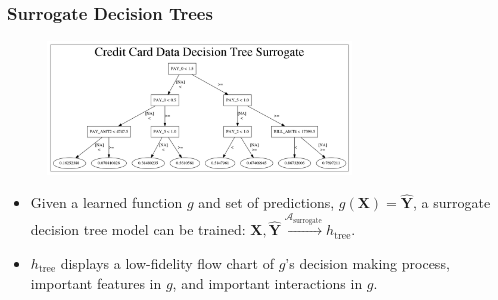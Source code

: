 \documentclass[11pt, 
               aspectratio=169]{beamer}
\begin{document}
	\begin{frame}
	
		\frametitle{Surrogate Decision Trees}
		
		\vspace{-10 pt}
		
		\begin{figure}[htb]
			\begin{center}
				\includegraphics[height=100pt]{img/dt_surrogate.png}
				\label{fig:dt_surrogate}
			\end{center}
		\end{figure}
		
		\vspace{-10 pt}
		
		\begin{itemize}
			
			\item Given a learned function $g$ and set of predictions, $g(\mathbf{X}) = \hat{\mathbf{Y}}$, a surrogate decision tree model can be trained: $ \mathbf{X},\hat{\mathbf{Y}} \xrightarrow{\mathcal{A}_{\text{surrogate}}} h_{\text{tree}}$.
	
			\item $h_{\text{tree}}$ displays a low-fidelity flow chart of $g$'s decision making process, important features in $g$, and important interactions in $g$.	
		
		\end{itemize}
		
	\end{frame}
	
\end{document}
